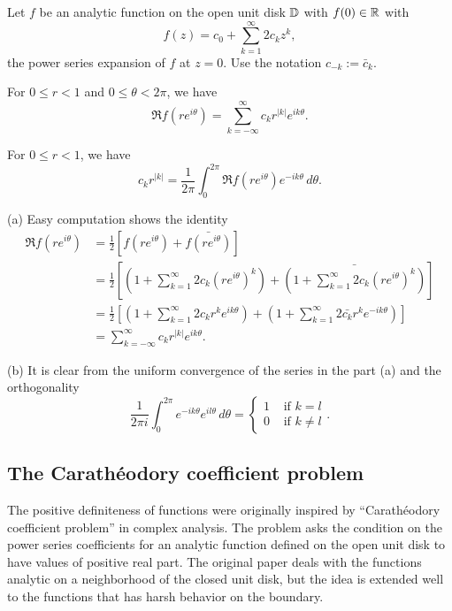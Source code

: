 \documentclass[12pt]{article}
\begin{document}
\begin{lem}
Let $f$ be an analytic function on the open unit disk $\mathbb{D}$ with $f(0)\in\mathbb{R}$ with
\[f(z)=c_0+\sum_{k=1}^\infty2c_kz^k,\]
the power series expansion of $f$ at $z=0$.
Use the notation $c_{-k}:=\bar c_k$.
\begin{parts}
\item For $0\le r<1$ and $0\le \theta<2\pi$, we have
\[\Re f(re^{i\theta})=\sum_{k=-\infty}^\infty c_kr^{|k|}e^{ik\theta}.\]
\item For $0\le r<1$, we have
\[c_kr^{|k|}=\frac1{2\pi}\int_0^{2\pi}\Re f(re^{i\theta})e^{-ik\theta}\,d\theta.\]
\end{parts}
\end{lem}
\begin{pf}
(a)
Easy computation shows the identity
\begin{align*}
\Re f(re^{i\theta})
&=\frac12[f(re^{i\theta})+\bar{f(re^{i\theta})}]\\
&=\frac12\left[\left(1+\sum_{k=1}^\infty2c_k(re^{i\theta})^k\right)+\bar{\left(1+\sum_{k=1}^\infty2c_k(re^{i\theta})^k\right)}\right]\\
&=\frac12\left[\left(1+\sum_{k=1}^\infty2c_kr^ke^{ik\theta}\right)+\left(1+\sum_{k=1}^\infty2\bar{c_k}r^ke^{-ik\theta}\right)\right]\\
&=\sum_{k=-\infty}^\infty c_kr^{|k|}e^{ik\theta}.
\end{align*}

(b)
It is clear from the uniform convergence of the series in the part (a) and the orthogonality
\[\frac1{2\pi i}\int_0^{2\pi}e^{-ik\theta}e^{il\theta}\,d\theta=\begin{cases}1&\text{ if }k=l\\0&\text{ if }k\ne l\end{cases}.\]
\end{pf}

\subsection{The Carath\'eodory coefficient problem}

The positive definiteness of functions were originally inspired by ``Carath\'eodory coefficient problem'' in complex analysis.
The problem asks the condition on the power series coefficients for an analytic function defined on the open unit disk to have values of positive real part.
The original paper deals with the functions analytic on a neighborhood of the closed unit disk, but the idea is extended well to the functions that has harsh behavior on the boundary.
\end{document}
